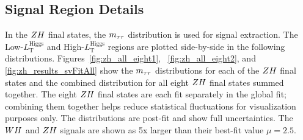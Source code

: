 \subsection{Signal Region Details}
\label{sec:vh_sr}

In the $ZH$ final states, the $m_{\tau\tau}$ distribution is
used for signal extraction. The Low-$L_{\text{T}}^{\textrm{Higgs}}$ and
High-$L_{\text{T}}^{\textrm{Higgs}}$ regions are plotted side-by-side
in the following distributions. Figures~\ref{fig:zh_all_eight1}, ~\ref{fig:zh_all_eight2}, 
and \ref{fig:zh_results_svFitAll} show the $m_{\tau\tau}$ distributions 
for each of the $ZH$ final states and the combined distribution for 
all eight $ZH$ final states summed together. The eight $ZH$ final states are each 
fit separately in the global fit; combining them together helps reduce statistical
fluctuations for visualization purposes only.
The distributions are post-fit and show full uncertainties.
The $WH$ and $ZH$ signals are shown as 5x larger than their best-fit
value $\mu = 2.5$.

